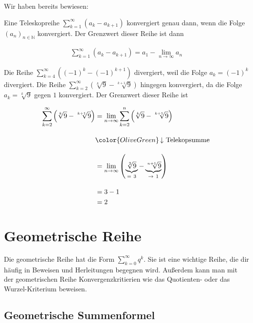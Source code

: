 \documentclass[fontsize=9pt,
               parskip=half-,
               DIV=14,
               listof=chapterentry,
               tocflat]{scrbook}
\begin{document}
Wir haben bereits bewiesen:

\begin{theorem*}
Eine Teleskopreihe $\sum _{k=1}^{\infty }(a_{k}-a_{k+1})$ konvergiert genau dann, wenn die Folge $(a_{n})_{n\in \mathbb {N} }$ konvergiert. Der Grenzwert dieser Reihe ist dann

\begin{align*}
\sum _{k=1}^{\infty }(a_{k}-a_{k+1})=a_{1}-\lim _{n\to \infty }a_{n}
\end{align*}

\end{theorem*}

\begin{example*}[Teleskopreihe]
Die Reihe $\sum _{k=4}^{\infty }\left((-1)^{k}-(-1)^{k+1}\right)$ divergiert, weil die Folge $a_{k}=(-1)^{k}$ divergiert. Die Reihe $\sum _{k=2}^{\infty }\left({\sqrt[{k}]{9}}-{\sqrt[{k+1}]{9}}\right)$ hingegen konvergiert, da die Folge $a_{k}={\sqrt[{k}]{9}}$ gegen $1$ konvergiert. Der Grenzwert dieser Reihe ist

\begin{align*}
\sum _{k=2}^{\infty }\left({\sqrt[{k}]{9}}-{\sqrt[{k+1}]{9}}\right)&=\lim _{n\to \infty }\sum _{k=2}^{n}\left({\sqrt[{k}]{9}}-{\sqrt[{k+1}]{9}}\right)\\[1em]&{\color {OliveGreen}\left\downarrow \ {\text{Telekopsumme}}\right.}\\[1em]&=\lim _{n\to \infty }\left(\underbrace {\sqrt[{2}]{9}} _{=\ 3}-\underbrace {\sqrt[{n+1}]{9}} _{\to \ 1}\right)\\[1em]&=3-1\\&=2
\end{align*}

\end{example*}

\chapter{Geometrische Reihe}

Die geometrische Reihe hat die Form $\sum _{k=0}^{\infty }q^{k}$. Sie ist eine wichtige Reihe, die dir häufig in Beweisen und Herleitungen begegnen wird. Außerdem kann man mit der geometrischen Reihe Konvergenzkritierien wie das Quotienten- oder das Wurzel-Kriterium beweisen.

\section{Geometrische Summenformel}
\end{document}
